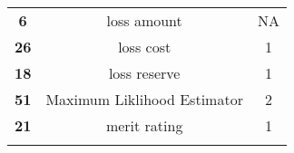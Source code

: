 \documentclass[]{book}
\theoremstyle{definition}
\theoremstyle{definition}
\theoremstyle{definition}
\theoremstyle{remark}
\begin{document}
\begin{longtable}[]{@{}ccc@{}}
\begin{minipage}[t]{0.11\columnwidth}\centering\strut
\textbf{6}\strut
\end{minipage} & \begin{minipage}[t]{0.42\columnwidth}\centering\strut
loss amount\strut
\end{minipage} & \begin{minipage}[t]{0.29\columnwidth}\centering\strut
NA\strut
\end{minipage}\tabularnewline
\begin{minipage}[t]{0.11\columnwidth}\centering\strut
\textbf{26}\strut
\end{minipage} & \begin{minipage}[t]{0.42\columnwidth}\centering\strut
loss cost\strut
\end{minipage} & \begin{minipage}[t]{0.29\columnwidth}\centering\strut
1\strut
\end{minipage}\tabularnewline
\begin{minipage}[t]{0.11\columnwidth}\centering\strut
\textbf{18}\strut
\end{minipage} & \begin{minipage}[t]{0.42\columnwidth}\centering\strut
loss reserve\strut
\end{minipage} & \begin{minipage}[t]{0.29\columnwidth}\centering\strut
1\strut
\end{minipage}\tabularnewline
\begin{minipage}[t]{0.11\columnwidth}\centering\strut
\textbf{51}\strut
\end{minipage} & \begin{minipage}[t]{0.42\columnwidth}\centering\strut
Maximum Liklihood Estimator\strut
\end{minipage} & \begin{minipage}[t]{0.29\columnwidth}\centering\strut
2\strut
\end{minipage}\tabularnewline
\begin{minipage}[t]{0.11\columnwidth}\centering\strut
\textbf{21}\strut
\end{minipage} & \begin{minipage}[t]{0.42\columnwidth}\centering\strut
merit rating\strut
\end{minipage} & \begin{minipage}[t]{0.29\columnwidth}\centering\strut
1\strut
\end{minipage}\tabularnewline
\begin{minipage}[t]{0.11\columnwidth}\centering\strut

\end{minipage}
\end{longtable}
\end{document}
